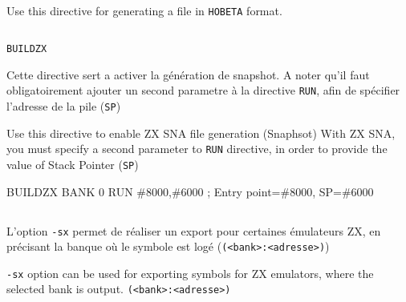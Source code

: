 \begin{xen}
Use this directive for generating a file in \texttt{HOBETA} format. 
\end{xen}

\subsection{}\label{ZXBANK}
\begin{verbatim}
BUILDZX
\end{verbatim}

\begin{xfr}
Cette directive sert a activer la génération de snapshot.
A noter qu'il faut obligatoirement ajouter un second parametre à la directive \texttt{RUN}, afin de spécifier l'adresse de la pile (\texttt{SP})
\end{xfr}

\begin{xen}
Use this directive to enable ZX SNA file generation (Snaphsot) 
With ZX SNA, you must specify a second parameter to \texttt{RUN} directive, in order to provide the value of Stack Pointer (\texttt{SP}) 
\end{xen}

\begin{code}
BUILDZX
BANK 0
RUN \#8000,\#6000 ; Entry point=\#8000, SP=\#6000
\end{code}

\subsection{}

\begin{xfr}
L'option \texttt{-sx} permet de réaliser un export pour certaines émulateurs ZX, en précisant la banque où le symbole est logé (\texttt{(<bank>:<adresse>)})
\end{xfr}

\begin{xen}
\texttt{-sx} option can be used for exporting symbols for ZX emulators, where the selected bank is output. \texttt{(<bank>:<adresse>)}
\end{xen}
